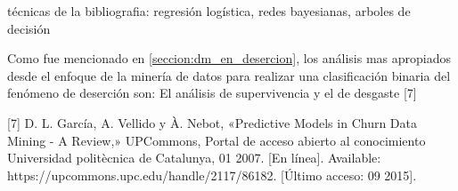 técnicas de la bibliografia: regresión logística, redes bayesianas, arboles de decisión


Como fue mencionado en \ref{seccion:dm_en_desercion}, los análisis mas apropiados desde el enfoque de la minería de datos para realizar una clasificación binaria del fenómeno de deserción son: El análisis de supervivencia y el de desgaste [7]

[7] D. L. García, A. Vellido y À. Nebot, «Predictive Models in Churn Data Mining - A
Review,» UPCommons, Portal de acceso abierto al conocimiento Universidad
politècnica de Catalunya, 01 2007. [En línea]. Available:
https://upcommons.upc.edu/handle/2117/86182. [Último acceso: 09 2015].



